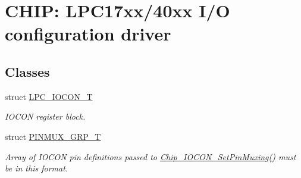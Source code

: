 \hypertarget{group__IOCON__17XX__40XX}{}\section{C\+H\+IP\+: L\+P\+C17xx/40xx I/O configuration driver}
\label{group__IOCON__17XX__40XX}
\subsection*{Classes}
\begin{DoxyCompactItemize}
\item 
struct \hyperlink{structLPC__IOCON__T}{L\+P\+C\+\_\+\+I\+O\+C\+O\+N\+\_\+T}
\begin{DoxyCompactList}\small\item\em I\+O\+C\+ON register block. \end{DoxyCompactList}\item 
struct \hyperlink{structPINMUX__GRP__T}{P\+I\+N\+M\+U\+X\+\_\+\+G\+R\+P\+\_\+T}
\begin{DoxyCompactList}\small\item\em Array of I\+O\+C\+ON pin definitions passed to \hyperlink{group__IOCON__17XX__40XX_gad97c96e401016cf296e6d20454f1c522}{Chip\+\_\+\+I\+O\+C\+O\+N\+\_\+\+Set\+Pin\+Muxing()} must be in this format. \end{DoxyCompactList}\end{DoxyCompactItemize}
